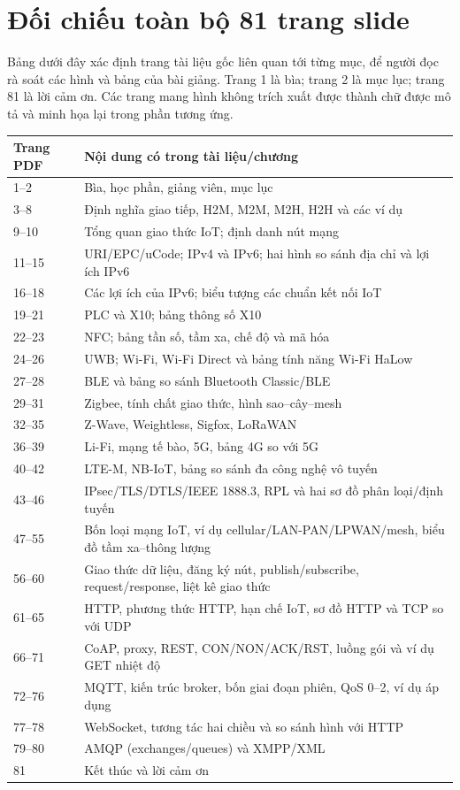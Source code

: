 \section{Đối chiếu toàn bộ 81 trang slide}
Bảng dưới đây xác định trang tài liệu gốc liên quan tới từng mục, để người đọc rà soát các hình và bảng của bài giảng. Trang 1 là bìa; trang 2 là mục lục; trang 81 là lời cảm ơn. Các trang mang hình không trích xuất được thành chữ được mô tả và minh họa lại trong phần tương ứng.
\begin{longtable}{p{3.0cm}p{10cm}}
\toprule Trang PDF & Nội dung có trong tài liệu/chương\\\midrule\endhead
1--2 & Bìa, học phần, giảng viên, mục lục\\
3--8 & Định nghĩa giao tiếp, H2M, M2M, M2H, H2H và các ví dụ\\
9--10 & Tổng quan giao thức IoT; định danh nút mạng\\
11--15 & URI/EPC/uCode; IPv4 và IPv6; hai hình so sánh địa chỉ và lợi ích IPv6\\
16--18 & Các lợi ích của IPv6; biểu tượng các chuẩn kết nối IoT\\
19--21 & PLC và X10; bảng thông số X10\\
22--23 & NFC; bảng tần số, tầm xa, chế độ và mã hóa\\
24--26 & UWB; Wi-Fi, Wi-Fi Direct và bảng tính năng Wi-Fi HaLow\\
27--28 & BLE và bảng so sánh Bluetooth Classic/BLE\\
29--31 & Zigbee, tính chất giao thức, hình sao--cây--mesh\\
32--35 & Z-Wave, Weightless, Sigfox, LoRaWAN\\
36--39 & Li-Fi, mạng tế bào, 5G, bảng 4G so với 5G\\
40--42 & LTE-M, NB-IoT, bảng so sánh đa công nghệ vô tuyến\\
43--46 & IPsec/TLS/DTLS/IEEE 1888.3, RPL và hai sơ đồ phân loại/định tuyến\\
47--55 & Bốn loại mạng IoT, ví dụ cellular/LAN-PAN/LPWAN/mesh, biểu đồ tầm xa--thông lượng\\
56--60 & Giao thức dữ liệu, đăng ký nút, publish/subscribe, request/response, liệt kê giao thức\\
61--65 & HTTP, phương thức HTTP, hạn chế IoT, sơ đồ HTTP và TCP so với UDP\\
66--71 & CoAP, proxy, REST, CON/NON/ACK/RST, luồng gói và ví dụ GET nhiệt độ\\
72--76 & MQTT, kiến trúc broker, bốn giai đoạn phiên, QoS 0--2, ví dụ áp dụng\\
77--78 & WebSocket, tương tác hai chiều và so sánh hình với HTTP\\
79--80 & AMQP (exchanges/queues) và XMPP/XML\\
81 & Kết thúc và lời cảm ơn\\\bottomrule
\end{longtable}

